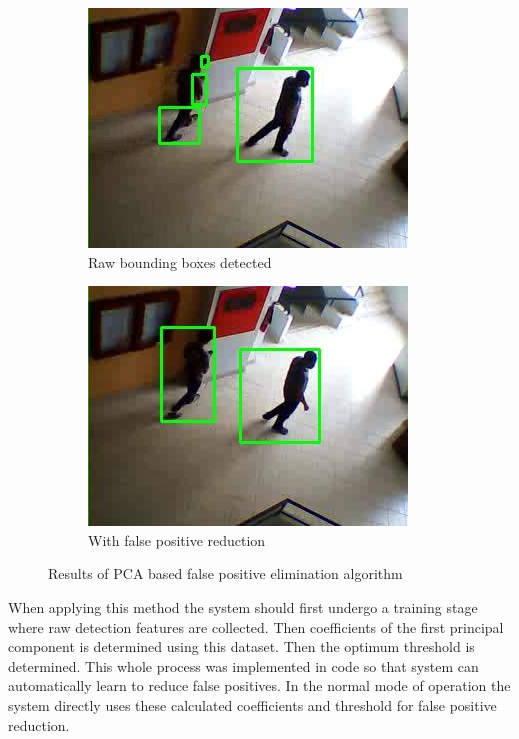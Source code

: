 \documentclass[12pt,a4paper]{report}
\begin{document}
\begin{figure}
\begin{subfigure}{.5\textwidth}
  \centering
  \includegraphics[width=.8\linewidth]{pca/fals_positives.jpg}
  \caption{Raw bounding boxes detected}
  \label{pca4:1}
\end{subfigure}%
\begin{subfigure}{.5\textwidth}
  \centering
  \includegraphics[width=.8\linewidth]{pca/false_positives_eliminated.jpg}
  \caption{With false positive reduction}
  \label{pca4:2}
\end{subfigure}
\caption{Results of PCA based false positive elimination algorithm}
\label{pca4:pca4}
\end{figure}

When applying this method the system should first undergo a training stage where raw detection features are collected. Then coefficients of the first principal component is determined using this dataset. Then the optimum threshold is determined. This whole process was implemented in code so that system can automatically learn to reduce false positives. In the normal mode of operation the system directly uses these calculated coefficients and threshold for false positive reduction.
\end{document}
